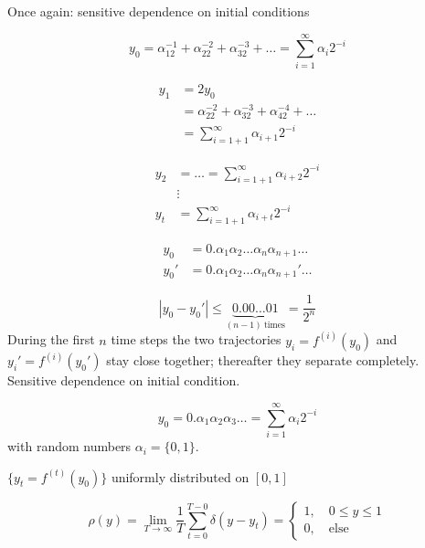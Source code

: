 \begin{framed}
Once again: sensitive dependence on initial conditions

\begin{equation}
y_0 = \alpha_12^{-1} + \alpha_22^{-2} + \alpha_32^{-3} + \dots = \sum_{i=1}^\infty\alpha_i2^{-i}
\end{equation}

\begin{align}
y_1 &= 2y_0 \\
&= \alpha_22^{-2} + \alpha_32^{-3} + \alpha_42^{-4}+\dots\\
&= \sum_{i=1+1}^\infty\alpha_{i+1}2^{-i}
\end{align}

\begin{align}
y_2 &= \dots = \sum_{i=1+1}^\infty\alpha_{i+2}2^{-i}\\
&\vdots\\
y_t &= \sum_{i=1+1}^\infty\alpha_{i+t}2^{-i}
\end{align}

\begin{align}
y_0 &= 0.\alpha_1\alpha_2\dots\alpha_n\alpha_{n+1}\dots\\
y_0' &= 0.\alpha_1\alpha_2\dots\alpha_n\alpha_{n+1}'\dots
\end{align}

\begin{equation}
|y_0-y_0'|\leq \underbrace{0.00\dots01}_{(n-1)\ \mathrm{times}} = \frac{1}{2^n}
\end{equation}
During the first $n$ time steps the two trajectories $y_i=f^{(i)}(y_0)$ and $y_i'=f^{(i)}(y_0')$ stay close together; thereafter they separate completely. Sensitive dependence on initial condition.
\end{framed}

\begin{equation}
y_0=0.\alpha_1\alpha_2\alpha_3\dots=\sum_{i=1}^\infty\alpha_i2^{-i}
\end{equation}
with random numbers $\alpha_i=\{0,1\}$.

$\{y_t=f^{(t)}(y_0)\}$ uniformly distributed on $[0,1]$

\begin{equation}
\rho(y) = \lim_{T\rightarrow\infty}\frac{1}{T}\sum_{t=0}^{T-0}\delta(y-y_t) = \begin{cases}
1,\quad 0\leq y \leq 1 \\ 0, \quad \mathrm{else} \end{cases}
\end{equation}

